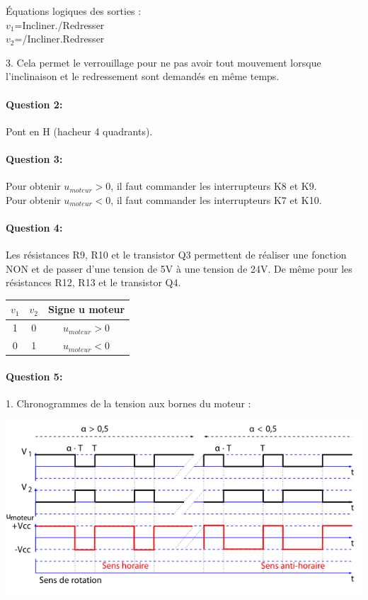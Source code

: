 Équations logiques des sorties : \\
$v_1$=Incliner./Redresser \\
$v_2$=/Incliner.Redresser
 
3. Cela permet le verrouillage pour ne pas avoir tout mouvement lorsque l'inclinaison et le redressement sont demandés en même temps.

\paragraph{Question 2:} 
Pont en H (hacheur 4 quadrants).

\paragraph{Question 3:} 

Pour obtenir $u_{moteur}>0$, il faut commander les interrupteurs K8 et K9.\\
Pour obtenir $u_{moteur}<0$, il faut commander les interrupteurs K7 et K10.

\paragraph{Question 4:} 

Les résistances R9, R10 et le transistor Q3 permettent de réaliser une fonction NON et de passer d'une tension de 5V à une tension de 24V. De même pour les résistances R12, R13 et le transistor Q4.

\begin{center}
\begin{tabular}{|c|c|c|}
\hline
$v_1$ & $v_2$ & Signe u moteur\\
\hline
1 & 0 & $u_{moteur}>0$ \\
\hline
0 & 1 & $u_{moteur}<0$ \\
\hline
\end{tabular}
\end{center}

\paragraph{Question 5:} 
1. Chronogrammes de la tension aux bornes du moteur :

\begin{center}
 \includegraphics[width=0.7\linewidth]{img/img04}
\end{center}

